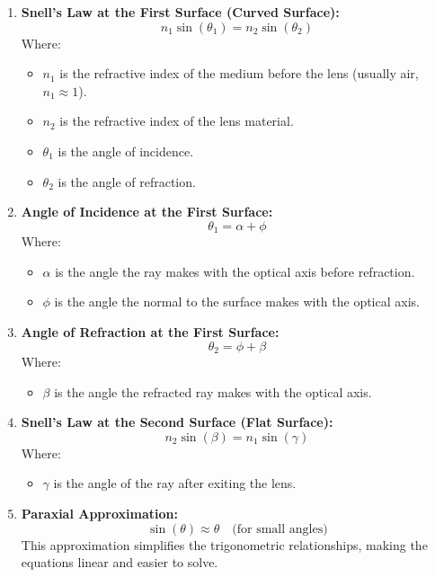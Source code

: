 \documentclass[a4paper]{article}
\begin{document}
\begin{enumerate}
    \item \textbf{Snell's Law at the First Surface (Curved Surface):}
    \[
    n_1 \sin(\theta_1) = n_2 \sin(\theta_2)
    \]
    Where:
    \begin{itemize}
        \item \( n_1 \) is the refractive index of the medium before the lens (usually air, \( n_1 \approx 1 \)).
        \item \( n_2 \) is the refractive index of the lens material.
        \item \( \theta_1 \) is the angle of incidence.
        \item \( \theta_2 \) is the angle of refraction.
    \end{itemize}

    \item \textbf{Angle of Incidence at the First Surface:}
    \[
    \theta_1 = \alpha + \phi
    \]
    Where:
    \begin{itemize}
        \item \( \alpha \) is the angle the ray makes with the optical axis before refraction.
        \item \( \phi \) is the angle the normal to the surface makes with the optical axis.
    \end{itemize}

    \item \textbf{Angle of Refraction at the First Surface:}
    \[
    \theta_2 = \phi + \beta
    \]
    Where:
    \begin{itemize}
        \item \( \beta \) is the angle the refracted ray makes with the optical axis.
    \end{itemize}

    \item \textbf{Snell's Law at the Second Surface (Flat Surface):}
    \[
    n_2 \sin(\beta) = n_1 \sin(\gamma)
    \]
    Where:
    \begin{itemize}
        \item \( \gamma \) is the angle of the ray after exiting the lens.
    \end{itemize}

    \item \textbf{Paraxial Approximation:}
    \[
    \sin(\theta) \approx \theta \quad \text{(for small angles)}
    \]
    This approximation simplifies the trigonometric relationships, making the equations linear and easier to solve.
\end{enumerate}
\end{document}
